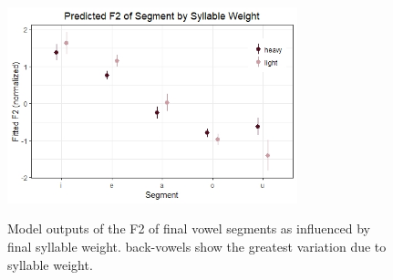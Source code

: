 \documentclass[12pt]{ouparticle}
\begin{document}

\newpage

\begin{figure}[ht]
    \centering
    \caption{Model outputs of the F2 of final vowel segments as influenced by final syllable weight. back-vowels show the greatest variation due to syllable weight.}
    \includegraphics[width=0.75\textwidth]{Figure6.jpg}
    \label{fig:stats_f2_final}
\end{figure}
\end{document}
